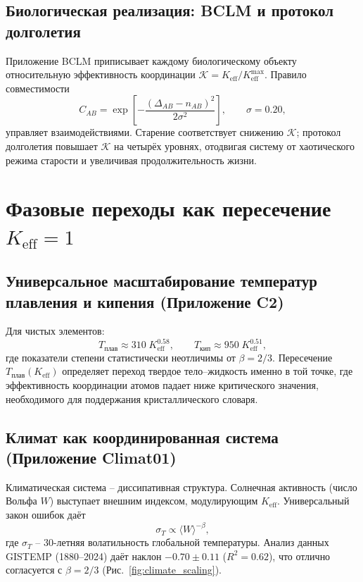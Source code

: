 \documentclass[12pt,a4paper]{article}
\newcommand{\Keff}{K_{\mathrm{eff}}}
\newcommand{\REL}{\mathcal{K}}
\begin{document}
	\subsection{Биологическая реализация: BCLM и протокол долголетия}
	
	Приложение BCLM приписывает каждому биологическому объекту относительную эффективность координации
	$\REL = \Keff/\Keff^{\max}$. Правило совместимости
	\[
	C_{AB} = \exp\!\left[-\frac{(\Delta_{AB} - n_{AB})^2}{2\sigma^2}\right],\qquad \sigma = 0.20,
	\]
	управляет взаимодействиями. Старение соответствует снижению $\REL$; протокол долголетия
	повышает $\REL$ на четырёх уровнях, отодвигая систему от хаотического режима старости
	и увеличивая продолжительность жизни.
	
	\section{Фазовые переходы как пересечение $\Keff = 1$}
	
	\subsection{Универсальное масштабирование температур плавления и кипения (Приложение C2)}
	
	Для чистых элементов:
	\[
	T_{\text{плав}} \approx 310\;\Keff^{0.58}, \qquad
	T_{\text{кип}} \approx 950\;\Keff^{0.51},
	\]
	где показатели степени статистически неотличимы от $\beta = 2/3$.
	Пересечение $T_{\text{плав}}(\Keff)$ определяет переход твердое тело–жидкость именно в той точке,
	где эффективность координации атомов падает ниже критического значения, необходимого для
	поддержания кристаллического словаря.
	
	\subsection{Климат как координированная система (Приложение Climat01)}
	
	Климатическая система – диссипативная структура. Солнечная активность (число Вольфа $W$)
	выступает внешним индексом, модулирующим $\Keff$. Универсальный закон ошибок даёт
	\[
	\sigma_T \propto \langle W \rangle^{-\beta},
	\]
	где $\sigma_T$ – 30-летняя волатильность глобальной температуры. Анализ данных GISTEMP
	(1880–2024) даёт наклон $-0.70\pm0.11$ ($R^2=0.62$), что отлично согласуется с $\beta = 2/3$
	(Рис.~\ref{fig:climate_scaling}).
	
\end{document}
